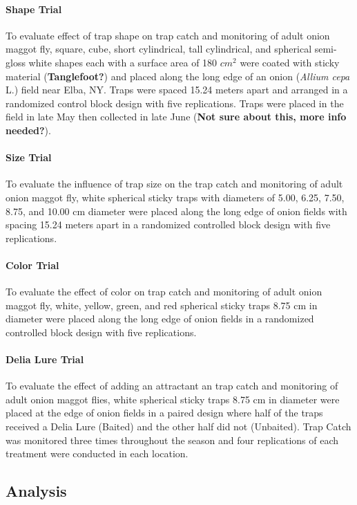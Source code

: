 \documentclass[alpha-refs]{wiley-article}
\begin{document}
\paragraph{Shape Trial} To evaluate effect of trap shape on trap catch and monitoring of adult onion maggot fly, square, cube, short cylindrical, tall cylindrical, and spherical semi-gloss white shapes each with a surface area of 180 $cm^2$  were coated with sticky material (\textbf{Tanglefoot?}) and placed along the long edge of an onion (\textit{Allium cepa} L.) field near Elba, NY.  Traps were spaced 15.24 meters apart and arranged in a randomized control block design with five replications.  Traps were placed in the field in late May then collected in late June (\textbf{Not sure about this, more info needed?}).   

\paragraph{Size Trial}
To evaluate the influence of trap size on the trap catch and monitoring of adult onion maggot fly, white spherical sticky traps with diameters of 5.00, 6.25, 7.50, 8.75, and 10.00 cm diameter were placed along the long edge of onion fields with spacing 15.24 meters apart in a randomized controlled block design with five replications.  

\paragraph{Color Trial}
To evaluate the effect of color on trap catch and monitoring of adult onion maggot fly, white, yellow, green, and red spherical sticky traps 8.75 cm in diameter were placed along the long edge of onion fields in a randomized controlled block design with five replications.  

\paragraph{Delia Lure Trial}
To evaluate the effect of adding an attractant an trap catch and monitoring of adult onion maggot flies, white spherical sticky traps 8.75 cm in diameter were placed at the edge of onion fields in a paired design where half of the traps received a Delia Lure (Baited) and the other half did not (Unbaited).  Trap Catch was monitored three times throughout the season and four replications of each treatment were conducted in each location.  


\subsection{Analysis}
\end{document}
